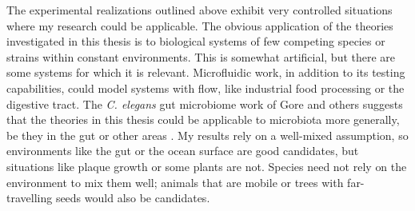 The experimental realizations outlined above exhibit very controlled situations where my research could be applicable. %
The obvious application of the theories investigated in this thesis is to biological systems of few competing species or strains within constant environments. %
This is somewhat artificial, but there are some systems for which it is relevant. 
Microfluidic work, in addition to its testing capabilities, could model systems with flow, like industrial food processing or the digestive tract. 
The \emph{C. elegans} gut microbiome work of Gore and others \cite{Vega2017,Roeselers2011} suggests that the theories in this thesis could be applicable to microbiota more generally, be they in the gut or other areas \cite{Manichanh2010,Koenig2011,Theriot2014,Wolfe2014,Fisher2015,Coburn2015,Datta2016}. 
My results rely on a well-mixed assumption, so environments like the gut or the ocean surface are good candidates, but situations like plaque growth \cite{Xavier2007} or some plants \cite{Shmida1984} are not. %
Species need not rely on the environment to mix them well; animals that are mobile or trees with far-travelling seeds would also be candidates. 


